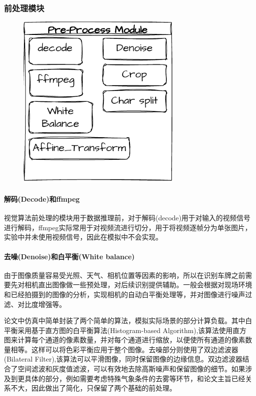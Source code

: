 \documentclass[master]{shtthesis}
\begin{document}
\subsubsection{前处理模块}
\begin{figure}[H]
	\centering
	\includegraphics[width=8cm]{img/m1.pdf}
	\label{前处理模块汇总}
\end{figure}
\paragraph{解码(Decode)和ffmpeg}
视觉算法前处理的模块用于数据推理前，对于解码(decode)用于对输入的视频信号进行解码，ffmpeg实际常用于对视频流进行切分，用于将视频逐帧分为单张图片，实验中并未使用视频信号，因此在模拟中不会实现。

\paragraph{去噪(Denoise)和白平衡(White balance)}

由于图像质量容易受光照、天气、相机位置等因素的影响，所以在识别车牌之前需要先对相机直出图像做一些预处理，对后续识别提供辅助。一般会根据对现场环境和已经拍摄到的图像的分析，实现相机的自动白平衡处理等，并对图像进行噪声过滤、对比度增强等。

论文中仿真中简单封装了两个简单的算法，模拟实际场景的部分计算负载。其中白平衡采用基于直方图的白平衡算法(Histogram-based Algorithm),该算法使用直方图来计算每个通道的像素数量，并对每个通道进行缩放，以便使所有通道的像素数量相等。这样可以将色彩平衡应用于整个图像。去噪部分则使用了双边滤波器(Bilateral Filter),该算法可以平滑图像，同时保留图像的边缘信息。双边滤波器结合了空间滤波和灰度值滤波，可以有效地去除高斯噪声和保留图像的细节。如果涉及到更具体的部分，例如需要考虑特殊气象条件的去雾等环节，和论文主旨已经关系不大，因此做出了简化，只保留了两个基础的前处理。
\end{document}
